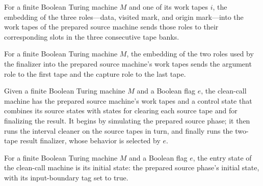 \begin{definition}
\label{Turing.FinTM.emCallTripleEmbedding}
\leanok
{}
For a finite Boolean Turing machine $M$ and one of its work tapes $i$, the embedding of
the three roles—data, visited mark, and origin mark—into the work tapes of the prepared
source machine sends those roles to their corresponding slots in the three consecutive
tape banks.
\end{definition}

\begin{definition}
\label{Turing.FinTM.emCallPairEmbedding}
\leanok
{}
For a finite Boolean Turing machine $M$, the embedding of the two roles used by the
finalizer into the prepared source machine's work tapes sends the argument role to the
first tape and the capture role to the last tape.
\end{definition}

\begin{definition}
\label{Turing.FinTM.callTM}
\leanok
{}
Given a finite Boolean Turing machine $M$ and a Boolean flag $e$, the clean-call machine
has the prepared source machine's work tapes and a control state that combines its
source states with states for clearing each source tape and for finalizing the result.
It begins by simulating the prepared source phase; it then runs the interval cleaner on
the source tapes in turn, and finally runs the two-tape result finalizer, whose behavior
is selected by $e$.
\end{definition}

\begin{definition}
\label{Turing.FinTM.callEntry}
\leanok
{}
For a finite Boolean Turing machine $M$ and a Boolean flag $e$, the entry state of the
clean-call machine is its initial state: the prepared source phase's initial state, with
its input-boundary tag set to true.
\end{definition}

